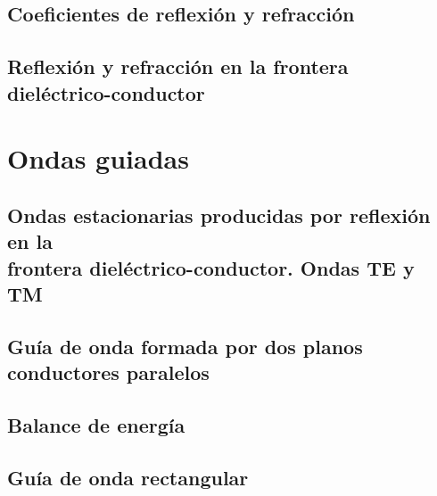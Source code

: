 \documentclass[a4paper]{book}
\begin{document}
\section{Coeficientes de reflexión y refracción}
\section[Reflexión y refracción en la frontera dieléctrico-conductor]{Reflexión y refracción en la frontera\\ dieléctrico-conductor}

\chapter{Ondas guiadas}
\section{\texorpdfstring{Ondas estacionarias producidas por reflexión en la\\ frontera dieléctrico-conductor. Ondas TE y TM}{Ondas estacionarias producidas por reflexión en la frontera dieléctrico-conductor. Ondas TE y TM}}
\section{Guía de onda formada por dos planos conductores paralelos}
\section{Balance de energía}
\section{Guía de onda rectangular}


%
\end{document}
